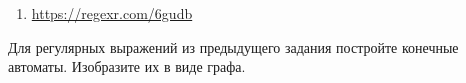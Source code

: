 \documentclass[]{article}
\begin{document}
\begin{enumerate}
\begin{item}
\begin{enumerate}
\begin{item}
\begin{enumerate}
                \begin{item}
                    \begin{itemize}
                        \item \lstinline|{5;7;-8}; $\Rightarrow$ 5;7;-8|
                        \item \lstinline|{0} $\Rightarrow$ 0|
                        \item \lstinline|0 $\Rightarrow$ $\varepsilon$|
                        \item \lstinline|{-25.6;.01;2} $\Rightarrow$ -25.6;.01;2|
                        \item \lstinline|{6;TheLetter;32} $\Rightarrow$ $\varepsilon$|
                        \item \lstinline|{6e+2;4.6E-1;-3.1e0}; $\Rightarrow$ 6e+2;4.6E-1;-3.1e0|
                        \item \lstinline|{6e} $\Rightarrow$ $\varepsilon$|
                        \item \lstinline|{4e+} $\Rightarrow$ $\varepsilon$|
                        \item \lstinline|{-.5} $\Rightarrow$ $\varepsilon$|
                        \item \lstinline|{5L;-32l;24.55f;-21F} $\Rightarrow$ 5L;-32l;24.55f;-21F|
                        \item \lstinline|{-0.216e+6F} $\Rightarrow$ -0.216e+6F|
                        \item \lstinline|{4e+5.4} $\Rightarrow$ $\varepsilon$|
                    \end{itemize}
                \end{item}

                \item \url{https://regexr.com/6gudb}

            \end{enumerate}
        \end{item}

    \end{enumerate}

\end{item}

\begin{item}
    Для регулярных выражений из предыдущего задания постройте конечные автоматы. Изобразите их в виде графа.
\end{item}

\end{enumerate}

\end{document}
